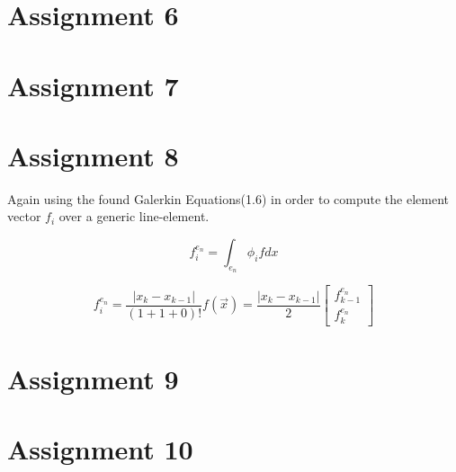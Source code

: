 \documentclass{report}
\begin{document}
\section{Assignment 6}


\section{Assignment 7}


\section{Assignment 8}
Again using the found Galerkin Equations(1.6) in order to compute the element vector $f_i$ over a generic line-element.

\begin{equation}
f^{e_n}_i = \int_{e_n}\phi_i f dx
\end{equation}

\begin{equation}
		f^{e_n}_i =\frac{\lvert x_k-x_{k-1}\lvert}{(1+1+0)!}f(\vec{x}) =\frac{\lvert x_k-x_{k-1}\lvert}{2}
	\begin{bmatrix} f^{e_n}_{k-1}\\ f^{e_n}_{k}
\end{bmatrix}
\end{equation}


\section{Assignment 9}


\section{Assignment 10}
\end{document}
